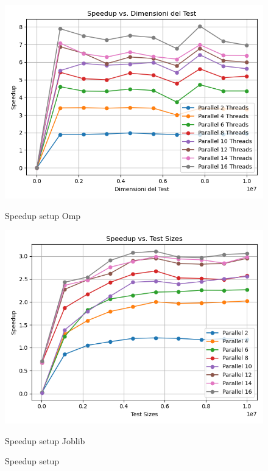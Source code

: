 \documentclass[11pt]{article}
\begin{document}
    \begin{figure}[H]
        \centering
        \includegraphics[width=\linewidth]{omp/001/setup_speedup_plot}
            \caption{Speedup setup Omp}\label{fig:setup_speedup_omp}
        \endminipage\hfill
        \includegraphics[width=\linewidth]{joblib/001/setup_speedup_plot}
            \caption{Speedup setup Joblib}\label{fig:setup_speedup_joblib}
        \endminipage\hfill
        \caption{Speedup setup}
    \end{figure}
\end{document}
